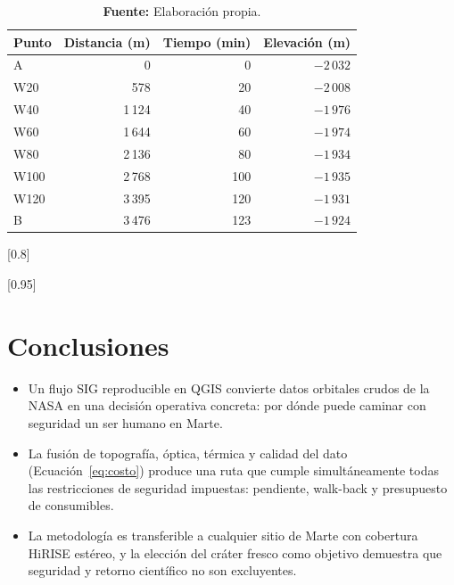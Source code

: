 \documentclass{article}
\begin{document}
\begin{table}[H]
\centering
\caption{Hitos y tiempos de la ruta (ida).}
\label{tab:tiempos}
\small
\begin{tabular}{l r r r}
\toprule
\textbf{Punto} & \textbf{Distancia (m)} & \textbf{Tiempo (min)} & \textbf{Elevación (m)} \\
\midrule
A    & 0      & 0   & $-2\,032$ \\
W20  & 578    & 20  & $-2\,008$ \\
W40  & 1\,124 & 40  & $-1\,976$ \\
W60  & 1\,644 & 60  & $-1\,974$ \\
W80  & 2\,136 & 80  & $-1\,934$ \\
W100 & 2\,768 & 100 & $-1\,935$ \\
W120 & 3\,395 & 120 & $-1\,931$ \\
B    & 3\,476 & 123 & $-1\,924$ \\
\bottomrule
\end{tabular}
\caption*{\textbf{Fuente:} Elaboración propia.}
\end{table}

[0.8]

[0.95]

\newpage

\section*{Conclusiones}

\begin{itemize}
    \item Un flujo SIG reproducible en QGIS convierte datos orbitales crudos de la NASA en una decisión operativa concreta: por dónde puede caminar con seguridad un ser humano en Marte.
    \item La fusión de topografía, óptica, térmica y calidad del dato (Ecuación~\ref{eq:costo}) produce una ruta que cumple simultáneamente todas las restricciones de seguridad impuestas: pendiente, walk-back y presupuesto de consumibles.
    \item La metodología es transferible a cualquier sitio de Marte con cobertura HiRISE estéreo, y la elección del cráter fresco como objetivo demuestra que seguridad y retorno científico no son excluyentes.
\end{itemize}
\end{document}
